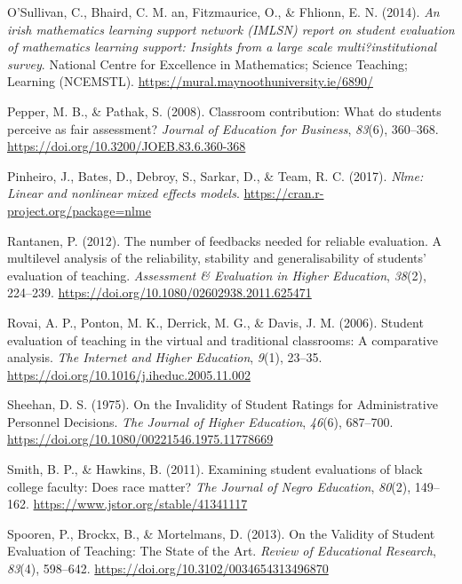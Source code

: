 \documentclass[
  man]{apa7}
\newlength{\cslhangindent}
\newlength{\cslentryspacingunit} %
\newenvironment{CSLReferences}[2] %
 {%
  \setlength{\parindent}{0pt}
  \ifodd #1
  \let\oldpar\par
  \def\par{\hangindent=\cslhangindent\oldpar}
  \fi
  \setlength{\parskip}{#2\cslentryspacingunit}
 }%
 {}
\begin{document}
\begin{CSLReferences}{1}{0}
\leavevmode{}%
O'Sullivan, C., Bhaird, C. M. an, Fitzmaurice, O., \& Fhlionn, E. N. (2014). \emph{An irish mathematics learning support network (IMLSN) report on student evaluation of mathematics learning support: Insights from a large scale multi?institutional survey}. National Centre for Excellence in Mathematics; Science Teaching; Learning (NCEMSTL). \url{https://mural.maynoothuniversity.ie/6890/}

\leavevmode{}%
Pepper, M. B., \& Pathak, S. (2008). Classroom contribution: What do students perceive as fair assessment? \emph{Journal of Education for Business}, \emph{83}(6), 360--368. \url{https://doi.org/10.3200/JOEB.83.6.360-368}

\leavevmode{}%
Pinheiro, J., Bates, D., Debroy, S., Sarkar, D., \& Team, R. C. (2017). \emph{Nlme: Linear and nonlinear mixed effects models}. \url{https://cran.r-project.org/package=nlme}

\leavevmode{}%
Rantanen, P. (2012). The number of feedbacks needed for reliable evaluation. A multilevel analysis of the reliability, stability and generalisability of students{'} evaluation of teaching. \emph{Assessment \& Evaluation in Higher Education}, \emph{38}(2), 224--239. \url{https://doi.org/10.1080/02602938.2011.625471}

\leavevmode{}%
Rovai, A. P., Ponton, M. K., Derrick, M. G., \& Davis, J. M. (2006). Student evaluation of teaching in the virtual and traditional classrooms: A comparative analysis. \emph{The Internet and Higher Education}, \emph{9}(1), 23--35. \url{https://doi.org/10.1016/j.iheduc.2005.11.002}

\leavevmode{}%
Sheehan, D. S. (1975). On the Invalidity of Student Ratings for Administrative Personnel Decisions. \emph{The Journal of Higher Education}, \emph{46}(6), 687--700. \url{https://doi.org/10.1080/00221546.1975.11778669}

\leavevmode{}%
Smith, B. P., \& Hawkins, B. (2011). Examining student evaluations of black college faculty: Does race matter? \emph{The Journal of Negro Education}, \emph{80}(2), 149--162. \url{https://www.jstor.org/stable/41341117}

\leavevmode{}%
Spooren, P., Brockx, B., \& Mortelmans, D. (2013). On the Validity of Student Evaluation of Teaching: The State of the Art. \emph{Review of Educational Research}, \emph{83}(4), 598--642. \url{https://doi.org/10.3102/0034654313496870}


\end{CSLReferences}
\end{document}
